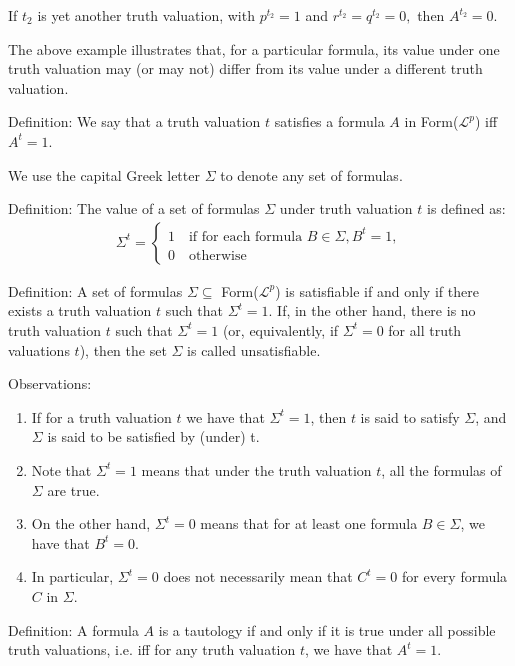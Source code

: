 \documentclass{article}
\begin{document}
If $t_2$ is yet another truth valuation, with $p^{t_2} = 1$ and $r^{t_2} = q^{t_2} = 0,$ then $A^{t_2} = 0$. 

The above example illustrates that, for a particular formula, its value under one truth valuation may (or may not) differ from its value under a different truth valuation. 

Definition: We say that a truth valuation $t$ satisfies a formula $A$ in Form($\mathcal{L}^p$) iff $A^t = 1$. 

We use the capital Greek letter $\Sigma$ to denote any set of formulas. 

Definition: The value of a set of formulas $\Sigma$ under truth valuation $t$ is defined as:
\begin{align*}
\Sigma^t = \begin{cases}
1 \quad \text{if for each formula } B \in \Sigma, B^t = 1, \\
0 \quad \text{otherwise}
\end{cases}
\end{align*}

Definition: A set of formulas $\Sigma \subseteq$ Form($\mathcal{L}^p$) is satisfiable if and only if there exists a truth valuation $t$ such that $\Sigma^t = 1$. If, in the other hand, there is no truth valuation $t$ such that $\Sigma^t = 1$ (or, equivalently, if $\Sigma^t = 0$ for all truth valuations $t$), then the set $\Sigma$ is called unsatisfiable. 

Observations:

\begin{enumerate}
    \item If for a truth valuation $t$ we have that $\Sigma^t = 1$, then $t$ is said to satisfy $\Sigma$, and $\Sigma$ is said to be satisfied by (under) t.
    \item Note that $\Sigma^t = 1$ means that under the truth valuation $t$, all the formulas of $\Sigma$ are true.
    \item On the other hand, $\Sigma^t = 0$ means that for at least one formula $B \in \Sigma$, we have that $B^t = 0$.
    \item In particular, $\Sigma^t = 0$ does not necessarily mean that $C^t = 0$ for every formula $C$ in $\Sigma$. 
\end{enumerate}

Definition: A formula $A$ is a tautology if and only if it is true under all possible truth valuations, i.e. iff for any truth valuation $t$, we have that $A^t = 1$. 
\end{document}
